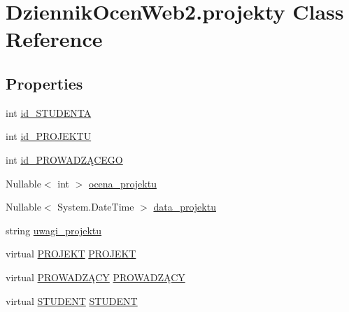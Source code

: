 \hypertarget{class_dziennik_ocen_web2_1_1projekty}{}\section{Dziennik\+Ocen\+Web2.\+projekty Class Reference}
\label{class_dziennik_ocen_web2_1_1projekty}
\subsection*{Properties}
\begin{DoxyCompactItemize}
\item 
int \hyperlink{class_dziennik_ocen_web2_1_1projekty_a358bd2a6d48327377151ff9f3c76b18f}{id\+\_\+\+S\+T\+U\+D\+E\+N\+TA}
\item 
int \hyperlink{class_dziennik_ocen_web2_1_1projekty_a4852de59c6fd809bba01a6369f692b50}{id\+\_\+\+P\+R\+O\+J\+E\+K\+TU}
\item 
int \hyperlink{class_dziennik_ocen_web2_1_1projekty_a7a6a4540f13cbfbeadee76e9b8cb9bcb}{id\+\_\+\+P\+R\+O\+W\+A\+D\+ZĄ\+C\+E\+GO}
\item 
Nullable$<$ int $>$ \hyperlink{class_dziennik_ocen_web2_1_1projekty_a5b1edf2beb2bd5e452d354deabf48925}{ocena\+\_\+projektu}
\item 
Nullable$<$ System.\+Date\+Time $>$ \hyperlink{class_dziennik_ocen_web2_1_1projekty_ab62a96d30e9d808b957532668bfb87a6}{data\+\_\+projektu}
\item 
string \hyperlink{class_dziennik_ocen_web2_1_1projekty_a471cababa1b0fbb4e6cda43493f72bc8}{uwagi\+\_\+projektu}
\item 
virtual \hyperlink{class_dziennik_ocen_web2_1_1_p_r_o_j_e_k_t}{P\+R\+O\+J\+E\+KT} \hyperlink{class_dziennik_ocen_web2_1_1projekty_ac665b7ca0ca45bd06976e7391c715a59}{P\+R\+O\+J\+E\+KT}
\item 
virtual \hyperlink{class_dziennik_ocen_web2_1_1_p_r_o_w_a_d_z_xC4_x84_c_y}{P\+R\+O\+W\+A\+D\+ZĄ\+CY} \hyperlink{class_dziennik_ocen_web2_1_1projekty_a61cf4f0d0ea11f9a579a5d49404a3bc8}{P\+R\+O\+W\+A\+D\+ZĄ\+CY}
\item 
virtual \hyperlink{class_dziennik_ocen_web2_1_1_s_t_u_d_e_n_t}{S\+T\+U\+D\+E\+NT} \hyperlink{class_dziennik_ocen_web2_1_1projekty_aa5da6dee04231489165719c3b7a2dec9}{S\+T\+U\+D\+E\+NT}
\end{DoxyCompactItemize}


